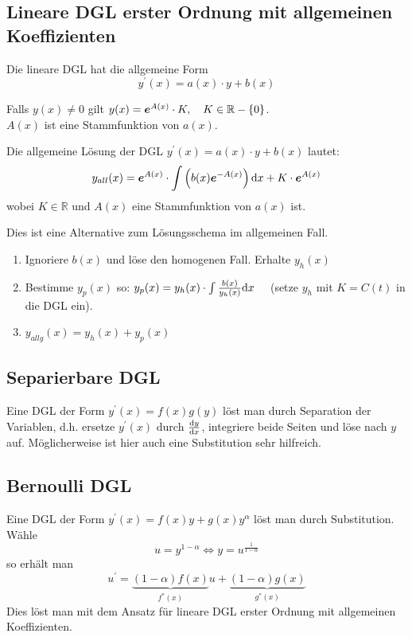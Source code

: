 		\subsection{Lineare DGL erster Ordnung mit allgemeinen Koeffizienten}
			Die lineare DGL hat die allgemeine Form
			$$ y^\prime(x) = a(x)\cdot y + b(x) $$
			\begin{proofhelp}
				Falls $y(x) \neq 0$ gilt $y(x) = \boldsymbol{e}^{A(x)}\cdot K, \quad K \in \mathbb{R} - \{0\}$.\\ $A(x)$ ist eine Stammfunktion von $a(x)$.
			\end{proofhelp}
			\begin{proofhelp}
				Die allgemeine Lösung der DGL $ y^\prime(x) = a(x)\cdot y + b(x) $ lautet:
				$$ y_{all}(x) = \boldsymbol{e}^{A(x)}\cdot \int \left( b(x) \boldsymbol{e}^{-A(x)} \right) \mathrm{d} x + K \cdot \boldsymbol{e}^{A(x)} $$
				wobei $K \in \mathbb{R}$ und $A(x)$ eine Stammfunktion von $a(x)$ ist.
			\end{proofhelp}
			\begin{hint}
				Dies ist eine Alternative zum Lösungsschema im allgemeinen Fall. \\
				\begin{enumerate}
					\item Ignoriere $b(x)$ und löse den homogenen Fall. Erhalte $y_h(x)$
					\item Bestimme $y_p(x)$ so: $y_p(x) = y_h(x) \cdot \int \frac{b(x)}{y_h(x)} \mathrm{d} x \quad$ (setze $y_h$ mit $K = C(t)$ in die DGL ein).
					\item $y_{allg}(x) = y_h(x) + y_p(x)$
				\end{enumerate}
			\end{hint}
		\subsection{Separierbare DGL}
			\begin{hint}
				Eine DGL der Form $y^\prime(x) = f(x)g(y)$ löst man durch Separation der Variablen, d.h. ersetze $y^\prime(x)$ durch $\diff{y}{x}$, integriere beide Seiten und löse nach $y$ auf. Möglicherweise ist hier auch eine Substitution sehr hilfreich.
			\end{hint}
		\subsection{Bernoulli DGL}
			\begin{proofhelp}
				Eine DGL der Form $y^\prime(x) = f(x)y + g(x)y^{\alpha}$ löst man durch Substitution. Wähle 
				$$u = y^{1 - \alpha} \Leftrightarrow y = u^{\frac{1}{1-\alpha}}$$
				so erhält man
				$$ u^\prime = \underbrace{(1 - \alpha)f(x)}_{f^*(x)}u + \underbrace{(1 - \alpha) g(x)}_{g^*(x)} $$
				Dies löst man mit dem Ansatz für lineare DGL erster Ordnung mit allgemeinen Koeffizienten.
			\end{proofhelp}